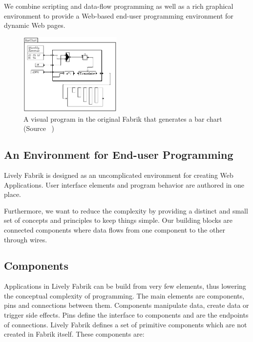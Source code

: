\documentclass[pdftex, times, 10pt, twocolumn]{article}
\begin{document}
We combine scripting and data-flow programming as well as a rich graphical environment to provide a Web-based end-user programming environment for dynamic Web pages.  



\begin{figure}[]\centering
\includegraphics[width=0.450000\textwidth]{Fabrik_figure6.png} 

\caption{A visual program in the original Fabrik that generates a bar chart (Source ~\cite{Ingalls1988FVP}) }
\label{fig:FabrikBarChart}
\end{figure}


\subsection{An Environment for End-user Programming}
Lively Fabrik is designed as an uncomplicated environment for creating Web Applications. User interface elements and program behavior are authored in one place.  

Furthermore, we want to reduce the complexity by providing a distinct and small set of concepts and principles to keep things simple. Our building blocks are connected components where data flows from one component to the other through wires.  



\subsection{Components}
Applications in Lively Fabrik can be build from very few elements, thus lowering the conceptual complexity of programming. The main elements are components, pins and connections between them. Components manipulate data, create data or trigger side effects. Pins define the interface to components and are the endpoints of connections. Lively Fabrik defines a set of primitive components which are not created in Fabrik itself. These components are: 
\end{document}
